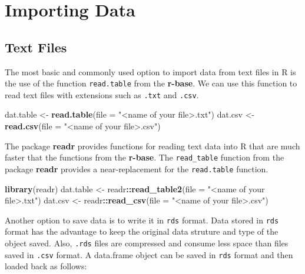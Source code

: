 \documentclass[]{book}
\newenvironment{Shaded}{\begin{snugshade}}{\end{snugshade}}
\newcommand{\KeywordTok}[1]{\textcolor[rgb]{0.13,0.29,0.53}{\textbf{#1}}}
\newcommand{\DataTypeTok}[1]{\textcolor[rgb]{0.13,0.29,0.53}{#1}}
\newcommand{\StringTok}[1]{\textcolor[rgb]{0.31,0.60,0.02}{#1}}
\newcommand{\OperatorTok}[1]{\textcolor[rgb]{0.81,0.36,0.00}{\textbf{#1}}}
\newcommand{\NormalTok}[1]{#1}
\theoremstyle{definition}
\theoremstyle{definition}
\theoremstyle{definition}
\theoremstyle{remark}
\begin{document}
\section{Importing Data}\label{importing-data}

\subsection{Text Files}\label{text-files}

The most basic and commonly used option to import data from text files
in R is the use of the function \texttt{read.table} from the
\textbf{r-base}. We can use this function to read text files with
extensions such as \texttt{.txt} and \texttt{.csv}.

\begin{Shaded}
\begin{Highlighting}[]
\NormalTok{dat.table <-}\StringTok{ }\KeywordTok{read.table}\NormalTok{(}\DataTypeTok{file =} \StringTok{"<name of your file>.txt"}\NormalTok{)}
\NormalTok{dat.csv <-}\StringTok{ }\KeywordTok{read.csv}\NormalTok{(}\DataTypeTok{file =} \StringTok{"<name of your file>.csv"}\NormalTok{)}
\end{Highlighting}
\end{Shaded}

The package \textbf{readr} provides functions for reading text data into
R that are much faster that the functions from the \textbf{r-base}. The
\texttt{read\_table} function from the package \textbf{readr} provides a
near-replacement for the \texttt{read.table} function.

\begin{Shaded}
\begin{Highlighting}[]
\KeywordTok{library}\NormalTok{(readr)}
\NormalTok{dat.table <-}\StringTok{ }\NormalTok{readr}\OperatorTok{::}\KeywordTok{read_table2}\NormalTok{(}\DataTypeTok{file =} \StringTok{"<name of your file>.txt"}\NormalTok{)}
\NormalTok{dat.csv <-}\StringTok{ }\NormalTok{readr}\OperatorTok{::}\KeywordTok{read_csv}\NormalTok{(}\DataTypeTok{file =} \StringTok{"<name of your file>.csv"}\NormalTok{)}
\end{Highlighting}
\end{Shaded}

Another option to save data is to write it in \texttt{rds} format. Data
stored in \texttt{rds} format has the advantage to keep the original
data struture and type of the object saved. Also, \texttt{.rds} files
are compressed and consume less space than files saved in \texttt{.csv}
format. A data.frame object can be saved in \texttt{rds} format and then
loaded back as follows:
\end{document}
